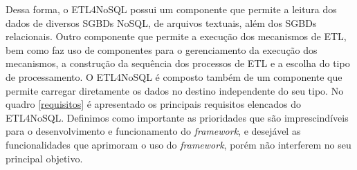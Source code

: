 Dessa forma, o ETL4NoSQL possui um componente que permite a leitura dos dados de diversos SGBDs NoSQL, de arquivos textuais, além dos SGBDs relacionais. Outro componente que permite a execução dos mecanismos de ETL, bem como faz uso de componentes para o gerenciamento da execução dos mecanismos, a construção da sequência dos processos de ETL e a escolha do tipo de processamento. O ETL4NoSQL é composto também de um componente que permite carregar diretamente os dados no destino independente do seu tipo. No quadro \ref{requisitos} é apresentado os principais requisitos elencados do ETL4NoSQL. Definimos como importante as prioridades que são imprescindíveis para o desenvolvimento e funcionamento do \textit{framework}, e desejável as funcionalidades que aprimoram o uso do \textit{framework}, porém não interferem no seu principal objetivo.

